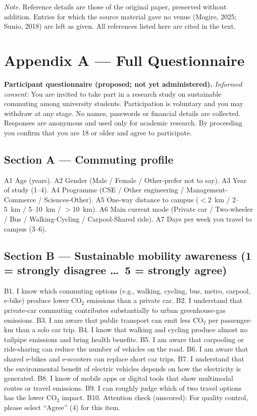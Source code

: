 \documentclass[11pt,a4paper]{article}
\begin{document}
\noindent\textit{Note.} Reference details are those of the original paper, preserved without
addition. Entries for which the source material gave no venue (Mogire, 2025; Sunio, 2018) are left as
given. All references listed here are cited in the text.

\appendix

\section{Appendix A --- Full Questionnaire}
\label{app:questionnaire}

\textbf{Participant questionnaire (proposed; not yet administered).} \textit{Informed consent:} You are
invited to take part in a research study on sustainable commuting among university students.
Participation is voluntary and you may withdraw at any stage. No names, passwords or financial details
are collected. Responses are anonymous and used only for academic research. By proceeding you confirm
that you are 18 or older and agree to participate.

\subsection*{Section A --- Commuting profile}
A1 Age (years). A2 Gender (Male / Female / Other-prefer not to say). A3 Year of study (1--4).
A4 Programme (CSE / Other engineering / Management-Commerce / Sciences-Other). A5 One-way distance to
campus ($<$2~km / 2--5~km / 5--10~km / $>$10~km). A6 Main current mode (Private car / Two-wheeler /
Bus / Walking-Cycling / Carpool-Shared ride). A7 Days per week you travel to campus (3--6).

\subsection*{Section B --- Sustainable mobility awareness (1 = strongly disagree \dots\ 5 = strongly agree)}
B1. I know which commuting options (e.g., walking, cycling, bus, metro, carpool, e-bike) produce lower
CO$_2$ emissions than a private car. B2. I understand that private-car commuting contributes
substantially to urban greenhouse-gas emissions. B3. I am aware that public transport can emit less
CO$_2$ per passenger-km than a solo car trip. B4. I know that walking and cycling produce almost no
tailpipe emissions and bring health benefits. B5. I am aware that carpooling or ride-sharing can reduce
the number of vehicles on the road. B6. I am aware that shared e-bikes and e-scooters can replace short
car trips. B7. I understand that the environmental benefit of electric vehicles depends on how the
electricity is generated. B8. I know of mobile apps or digital tools that show multimodal routes or
travel emissions. B9. I can roughly judge which of two travel options has the lower CO$_2$ impact.
B10. Attention check (unscored): For quality control, please select ``Agree'' (4) for this item.
\end{document}
